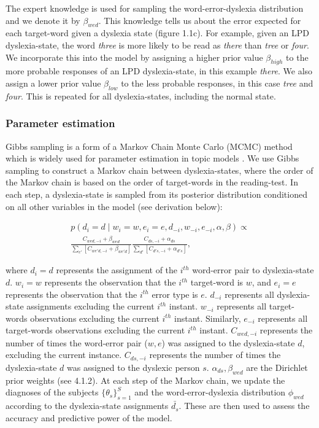 {The expert knowledge is used for sampling the word-error-dyslexia distribution and we denote it by $ \beta_{wed} $. This knowledge tells us about the error expected for each target-word given a dyslexia state (figure 1.1c). For example, given an LPD dyslexia-state, the word {\it three} is more likely to be read as {\it there} than {\it tree} or {\it four}. We incorporate this into the model by assigning a higher prior value $ \beta_{high} $ to the more probable responses of an LPD dyslexia-state, in this example {\it there}. We also assign a lower prior value $ \beta_{low} $ to the less probable responses, in this case {\it tree} and {\it four}. This is repeated for all dyslexia-states, including the normal state.

\subsubsection{Parameter estimation}
Gibbs sampling is a form of a Markov Chain Monte Carlo (MCMC) method which is widely used for parameter estimation in topic models \citep{gs04, rgss04}. We use Gibbs sampling to construct a Markov chain between dyslexia-states, where the order of the Markov chain is based on the order of target-words in the reading-test. In each step, a dyslexia-state is sampled from its posterior distribution conditioned on all other variables in the model (see derivation below): 

\begin{equation}
\begin{split}
p(d_i = d\mid w_i = w, e_i = e, d_{-i}, w_{-i}, e_{-i}, \alpha, \beta) \propto \\
\frac{ C_{wed, -i} + \beta_{wed} } {\sum_{e'} [C_{we'd, -i} + \beta_{we'd}] } \frac{ C_{ds, -i} + \alpha_{ds} } {{\sum_{d'}[ C_{d's, -i} + \alpha_{d's}] }},
\end{split}
\end{equation}

where $ d_i=d $ represents the assignment of the $ i^{th} $ word-error pair to dyslexia-state $d$. $ w_i = w $ represents the observation that the $i^{th}$ target-word is $w$, and $e_i = e $ represents the observation that the $i^{th}$ error type is $e$. $ d_{-i} $ represents all dyslexia-state assignments excluding the current $i^{th}$ instant. $ w_{-i} $ represents all target-words observations excluding the current $i^{th}$ instant. Similarly, $ e_{-i} $ represents all target-words observations excluding the current $i^{th}$ instant.
$ C_{wed, -i} $ represents the number of times the word-error pair ($w, e$) was assigned to the dyslexia-state $d$, excluding the current instance. $ C_{ds, -i} $ represents the number of times the dyslexia-state $d$ was assigned to the dyslexic person $s$. $ \alpha_{ds} , \beta_{wed} $ are the Dirichlet prior weights (see 4.1.2).
At each step of the Markov chain, we update the diagnoses of the subjects $ { \{ \theta_{s} \} }_{s=1}^S $ and the word-error-dyslexia distribution $ \phi_{wed} $ according to the dyslexia-state assignments $ \bar{d_{s}} $. These are then used to assess the accuracy and predictive power of the model.

}
